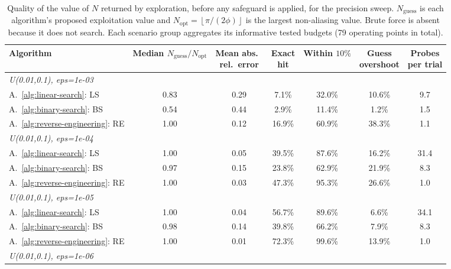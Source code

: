 \begin{table}[ht]
\centering
\small
\caption{Quality of the value of $N$ returned by exploration, before any safeguard is applied, for the precision sweep. $N_{\mathrm{guess}}$ is each algorithm's proposed exploitation value and $N_{\mathrm{opt}}=\left\lfloor\pi/(2\phi)\right\rfloor$ is the largest non-aliasing value. Brute force is absent because it does not search. Each scenario group aggregates its informative tested budgets (79 operating points in total).}
\label{tab:diag-exploration}
\begin{tabular}{lcccccc}
\toprule
Algorithm
& \makecell{Median \\ $N_{\mathrm{guess}}/N_{\mathrm{opt}}$}
& \makecell{Mean abs.\ \\ rel.\ error}
& \makecell{Exact \\ hit}
& \makecell{Within \\ $10\%$}
& \makecell{Guess \\ overshoot}
& \makecell{Probes \\ per trial} \\
\midrule
\multicolumn{7}{l}{\itshape U(0.01,0.1), eps=1e-03} \\
A.~\ref{alg:linear-search}: LS
& 0.83
& 0.29
& 7.1\%
& 32.0\%
& 10.6\%
& 9.7 \\
A.~\ref{alg:binary-search}: BS
& 0.54
& 0.44
& 2.9\%
& 11.4\%
& 1.2\%
& 1.5 \\
A.~\ref{alg:reverse-engineering}: RE
& 1.00
& 0.12
& 16.9\%
& 60.9\%
& 38.3\%
& 1.1 \\
\midrule
\multicolumn{7}{l}{\itshape U(0.01,0.1), eps=1e-04} \\
A.~\ref{alg:linear-search}: LS
& 1.00
& 0.05
& 39.5\%
& 87.6\%
& 16.2\%
& 31.4 \\
A.~\ref{alg:binary-search}: BS
& 0.97
& 0.15
& 23.8\%
& 62.9\%
& 21.9\%
& 8.3 \\
A.~\ref{alg:reverse-engineering}: RE
& 1.00
& 0.03
& 47.3\%
& 95.3\%
& 26.6\%
& 1.0 \\
\midrule
\multicolumn{7}{l}{\itshape U(0.01,0.1), eps=1e-05} \\
A.~\ref{alg:linear-search}: LS
& 1.00
& 0.04
& 56.7\%
& 89.6\%
& 6.6\%
& 34.1 \\
A.~\ref{alg:binary-search}: BS
& 0.98
& 0.14
& 39.8\%
& 66.2\%
& 7.9\%
& 8.3 \\
A.~\ref{alg:reverse-engineering}: RE
& 1.00
& 0.01
& 72.3\%
& 99.6\%
& 13.9\%
& 1.0 \\
\midrule
\multicolumn{7}{l}{\itshape U(0.01,0.1), eps=1e-06} \\

\end{tabular}
\end{table}
